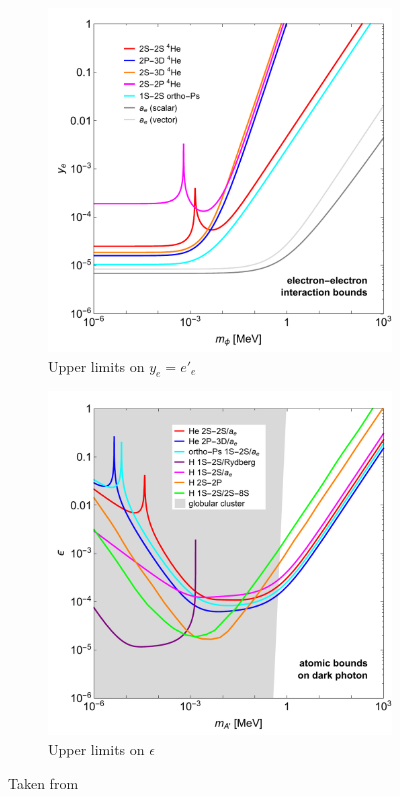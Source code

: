 \begin{figure}[H]
\centering
\begin{subfigure}{.5\textwidth}
  \centering
  \includegraphics[width=\linewidth]{imgs/yebound-final}
  \caption{Upper limits on $y_e = e'_e$}
\end{subfigure}%
\begin{subfigure}{.5\textwidth}
  \centering
  \includegraphics[width=\linewidth]{imgs/DP-final}
  \caption{Upper limits on $\epsilon$}
\end{subfigure}
\caption{Taken from \cite{Delaunay:2017dku} }
\label{fg:AtomicElectronBound}
\end{figure}

